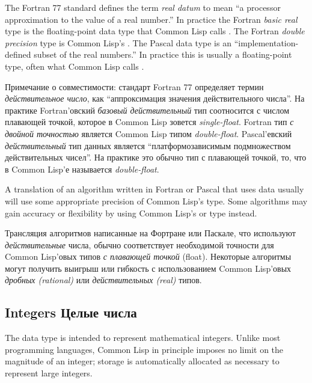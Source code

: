 \begin{newer}
\beforenoterule
\begin{incompatibility}
The Fortran 77 standard defines the term
             {\it real datum} to mean ``a processor approximation to the value
             of a real number.''  In practice the Fortran {\it basic real} type
             is the floating-point data type that Common Lisp calls
             .  The Fortran {\it double precision} type is
             Common Lisp's .  The Pascal  data type is
             an ``implementation-defined subset of the real numbers.''  In
             practice this is usually a floating-point type, often what
             Common Lisp calls .

Примечание о совместимости: стандарт Fortran 77 определяет термин
{\it действительное число}, как ``аппроксимация значения действительного
числа''. На практике Fortran'овский {\it базовый действительный} тип
соотносится с числом плавающей точкой, которое в Common Lisp
зовется {\it single-float}. Fortran тип {\it с двойной точностью} является
Common Lisp типом {\it double-float}. Pascal'евский {\it действительный} тип
данных является ``платформозависимым подмножеством действительных
чисел''. На практике это обычно тип с плавающей точкой, то, что в
Common Lisp'е называется {\it double-float}. 

             A translation of an algorithm written in Fortran or Pascal
             that uses  data usually will use some appropriate
             precision of Common Lisp's  type.  Some algorithms may
             gain accuracy or flexibility by using Common Lisp's
              or  type instead.

Трансляция алгоритмов написанные на Фортране или Паскале, что
используют {\it действительные} числа, обычно соответствует необходимой
точности для Common Lisp'овых типов {\it с плавающей точкой}
(float). Некоторые алгоритмы могут получить выигрыш или гибкость с
использованием Common Lisp'овых {\it дробных (rational)} или
{\it действительных (real)} типов. 
\end{incompatibility}
\afternoterule
\end{newer}

\subsection{Integers Целые числа}
\label{INTEGERS-SECTION}

The  data type is intended to represent mathematical integers.
Unlike most programming languages, Common Lisp in principle imposes no limit on
the magnitude of an integer; storage
is automatically allocated as necessary to represent large integers.

